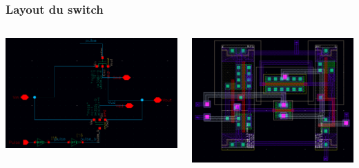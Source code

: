 \documentclass{beamer}
\begin{document}
\begin{frame}
\frametitle{Layout du switch}

  \begin{columns}[T]
    \includegraphics[width=\linewidth]{switchs_.png}

    \includegraphics[width=\linewidth]{layout_.png}
  \end{columns}

\end{frame}

\end{document}
